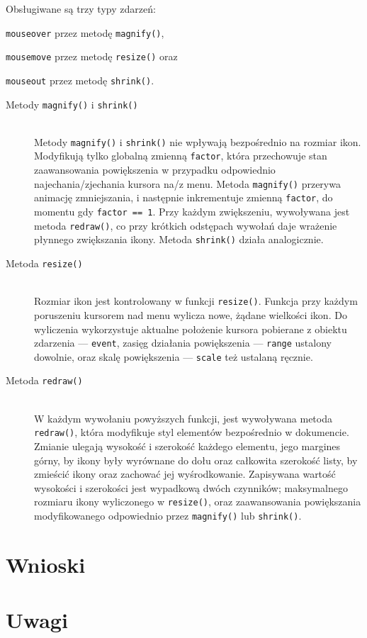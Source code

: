 \documentclass[10pt,a4paper]{article}
\newcommand{\f}[1]{\texttt{#1}}
\begin{document}
Obsługiwane są trzy typy zdarzeń:
\begin{inparaenum}
  \item \f{mouseover} przez metodę \f{magnify()},
  \item \f{mousemove} przez metodę \f{resize()} oraz
  \item \f{mouseout} przez metodę \f{shrink()}.
\end{inparaenum}
\begin{description}
  \item[Metody \f{magnify()} i \f{shrink()}] \hfill \\
    Metody \f{magnify()} i \f{shrink()} nie wpływają bezpośrednio na rozmiar
    ikon.  Modyfikują tylko globalną zmienną \f{factor}, która przechowuje stan
    zaawansowania powiększenia w przypadku odpowiednio najechania/zjechania
    kursora na/z menu.
    Metoda \f{magnify()} przerywa animację zmniejszania, i następnie
    inkrementuje zmienną \f{factor}, do momentu gdy \f{factor == 1}.  Przy
    każdym zwiększeniu, wywoływana jest metoda \f{redraw()}, co przy krótkich
    odstępach wywołań daje wrażenie płynnego zwiększania ikony. Metoda
    \f{shrink()} działa analogicznie.
  \item[Metoda \f{resize()}] \hfill \\
    Rozmiar ikon jest kontrolowany w funkcji \f{resize()}. Funkcja przy każdym
    poruszeniu kursorem nad menu wylicza nowe, żądane wielkości ikon. Do
    wyliczenia wykorzystuje aktualne położenie kursora pobierane z obiektu
    zdarzenia --- \f{event}, zasięg działania powiększenia --- \f{range}
    ustalony dowolnie, oraz skalę powiększenia --- \f{scale} też ustalaną
    ręcznie.
  \item[Metoda \f{redraw()}] \hfill \\
    W każdym wywołaniu powyższych funkcji, jest wywoływana metoda \f{redraw()},
    która modyfikuje styl elementów bezpośrednio w dokumencie. Zmianie ulegają
    wysokość i szerokość każdego elementu, jego margines górny, by ikony były
    wyrównane do dołu oraz całkowita szerokość listy, by zmieścić ikony oraz
    zachować jej wyśrodkowanie.
    Zapisywana wartość wysokości i szerokości jest wypadkową dwóch czynników;
    maksymalnego rozmiaru ikony wyliczonego w \f{resize()}, oraz zaawansowania
    powiększania modyfikowanego odpowiednio przez \f{magnify()} lub
    \f{shrink()}.
\end{description}



\section{Wnioski}



\section{Uwagi}
\end{document}
